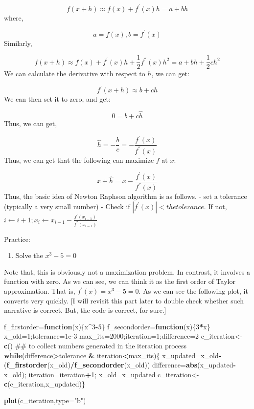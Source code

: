 \documentclass[]{book}
\newenvironment{Shaded}{\begin{snugshade}}{\end{snugshade}}
\newcommand{\KeywordTok}[1]{\textcolor[rgb]{0.13,0.29,0.53}{\textbf{#1}}}
\newcommand{\DataTypeTok}[1]{\textcolor[rgb]{0.13,0.29,0.53}{#1}}
\newcommand{\DecValTok}[1]{\textcolor[rgb]{0.00,0.00,0.81}{#1}}
\newcommand{\FloatTok}[1]{\textcolor[rgb]{0.00,0.00,0.81}{#1}}
\newcommand{\StringTok}[1]{\textcolor[rgb]{0.31,0.60,0.02}{#1}}
\newcommand{\ControlFlowTok}[1]{\textcolor[rgb]{0.13,0.29,0.53}{\textbf{#1}}}
\newcommand{\OperatorTok}[1]{\textcolor[rgb]{0.81,0.36,0.00}{\textbf{#1}}}
\newcommand{\NormalTok}[1]{#1}
\providecommand{\tightlist}{%
  \setlength{\itemsep}{0pt}\setlength{\parskip}{0pt}}
\begin{document}
\[f(x+h) \approx f(x)+f^{'}(x)h = a+bh\] where,

\[ a = f(x), b=f^{'}(x)\] Similarly,

\[f(x+h)\approx f(x)+f^{'}(x)h+\frac{1}{2}f^{''}(x)h^2=a+bh+\frac{1}{2}ch^2\]
We can calculate the derivative with respect to \(h\), we can get:

\[f^{'}(x+h) \approx b+ch\] We can then set it to zero, and get:

\[0=b+c \hat{h}\] Thus, we can get,

\[\hat{h} = -\frac{b}{c}=-\frac{f^{'}(x)}{f^{''}(x)}\] Thus, we can get
that the following can maximize \(f\) at \(x\):

\[x+\hat{h}=x-\frac{f^{'}(x)}{f^{''}(x)}\] Thus, the basic idea of
Newton Raphson algorithm is as follows. - set a tolerance (typically a
very small number) - Check if \(|f^{'}(x)|< the tolerance\). If not,
\(i \leftarrow i+1; x_i\leftarrow x_{i-1}-\frac{f^{'}(x_{i-1})}{f^{''}(x_{i-1})}\)

Practice:

\begin{enumerate}
\def\labelenumi{(\arabic{enumi})}
\tightlist
\item
  Solve the \(x^3-5=0\)
\end{enumerate}

Note that, this is obviously not a maximization problem. In contrast, it
involves a function with zero. As we can see, we can think it as the
first order of Taylor approximation. That is, \(f^{'}(x)=x^3-5=0\). As
we can see the following plot, it converts very quickly. {[}I will
revisit this part later to double check whether such narrative is
correct. But, the code is correct, for sure.{]}

\begin{Shaded}
\begin{Highlighting}[]
\NormalTok{f_firstorder=}\ControlFlowTok{function}\NormalTok{(x)\{x}\OperatorTok{^}\DecValTok{3}\OperatorTok{-}\DecValTok{5}\NormalTok{\}}
\NormalTok{f_secondorder=}\ControlFlowTok{function}\NormalTok{(x)\{}\DecValTok{3}\OperatorTok{*}\NormalTok{x\}}
\NormalTok{x_old=}\DecValTok{1}\NormalTok{;tolerance=}\FloatTok{1e-3}
\NormalTok{max_its=}\DecValTok{2000}\NormalTok{;iteration=}\DecValTok{1}\NormalTok{;difference=}\DecValTok{2}
\NormalTok{c_iteration<-}\KeywordTok{c}\NormalTok{() ## to collect numbers generated in the iteration process }
\ControlFlowTok{while}\NormalTok{(difference}\OperatorTok{>}\NormalTok{tolerance }\OperatorTok{&}\StringTok{ }\NormalTok{iteration}\OperatorTok{<}\NormalTok{max_its)\{}
\NormalTok{  x_updated=x_old}\OperatorTok{-}\NormalTok{(}\KeywordTok{f_firstorder}\NormalTok{(x_old)}\OperatorTok{/}\KeywordTok{f_secondorder}\NormalTok{(x_old))}
\NormalTok{  difference=}\KeywordTok{abs}\NormalTok{(x_updated}\OperatorTok{-}\NormalTok{x_old);}
\NormalTok{  iteration=iteration}\OperatorTok{+}\DecValTok{1}\NormalTok{;}
\NormalTok{  x_old=x_updated}
\NormalTok{  c_iteration<-}\KeywordTok{c}\NormalTok{(c_iteration,x_updated)\}}

\KeywordTok{plot}\NormalTok{(c_iteration,}\DataTypeTok{type=}\StringTok{"b"}\NormalTok{)}
\end{Highlighting}
\end{Shaded}
\end{document}
